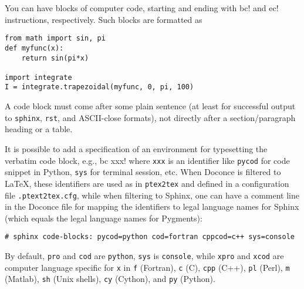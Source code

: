 \documentclass[%
oneside,                 %
final,                   %
10pt]{article}
\begin{document}
You can have blocks of computer code, starting and ending with
{\fontsize{10pt}{10pt}\Verb!!bc!} and {\fontsize{10pt}{10pt}\Verb!!ec!} instructions, respectively. Such blocks are formatted as

\providecommand{\shadedskip}{}
\renewenvironment{shadedskip}{
\def\FrameCommand{\colorbox{shadecolor}}\FrameRule0.6pt
\MakeFramed {\FrameRestore}\vskip3mm}{\vskip0mm\endMakeFramed}
\providecommand{\shadedquoteBlue}{}
\renewenvironment{shadedquoteBlue}[1][]{
\bgroup\rmfamily
\fboxsep=0mm\relax
\begin{shadedskip}
\list{}{\parsep=-2mm\parskip=0mm\topsep=0pt\leftmargin=2mm
\rightmargin=2\leftmargin\leftmargin=4pt\relax}
\item\relax}
{\endlist\end{shadedskip}\egroup}\begin{shadedquoteBlue}
\fontsize{9pt}{9pt}
\begin{Verbatim}
from math import sin, pi
def myfunc(x):
    return sin(pi*x)

import integrate
I = integrate.trapezoidal(myfunc, 0, pi, 100)
\end{Verbatim}
\end{shadedquoteBlue}
\noindent
A code block must come after some plain sentence (at least for successful
output to {\fontsize{10pt}{10pt}\Verb!sphinx!}, {\fontsize{10pt}{10pt}\Verb!rst!}, and ASCII-close formats),
not directly after a section/paragraph heading or a table.

It is possible to add a specification of an
environment for typesetting the verbatim code block, e.g., {\fontsize{10pt}{10pt}\Verb!!bc xxx!}
where {\fontsize{10pt}{10pt}\Verb!xxx!} is an identifier like {\fontsize{10pt}{10pt}\Verb!pycod!} for code snippet in Python,
{\fontsize{10pt}{10pt}\Verb!sys!} for terminal session, etc. When Doconce is filtered to {\LaTeX},
these identifiers are used as in {\fontsize{10pt}{10pt}\Verb!ptex2tex!} and defined in a
configuration file {\fontsize{10pt}{10pt}\Verb!.ptext2tex.cfg!}, while when filtering
to Sphinx, one can have a comment line in the Doconce file for
mapping the identifiers to legal language names for Sphinx (which equals
the legal language names for Pygments):
\begin{Verbatim}[fontsize=\fontsize{9pt}{9pt},tabsize=8,baselinestretch=0.85,
fontfamily=tt,xleftmargin=7mm]
# sphinx code-blocks: pycod=python cod=fortran cppcod=c++ sys=console
\end{Verbatim}
\noindent
By default, {\fontsize{10pt}{10pt}\Verb!pro!} and {\fontsize{10pt}{10pt}\Verb!cod!} are {\fontsize{10pt}{10pt}\Verb!python!}, {\fontsize{10pt}{10pt}\Verb!sys!} is {\fontsize{10pt}{10pt}\Verb!console!},
while {\fontsize{10pt}{10pt}\Verb!xpro!} and {\fontsize{10pt}{10pt}\Verb!xcod!} are computer language specific for {\fontsize{10pt}{10pt}\Verb!x!}
in {\fontsize{10pt}{10pt}\Verb!f!} (Fortran), {\fontsize{10pt}{10pt}\Verb!c!} (C), {\fontsize{10pt}{10pt}\Verb!cpp!} (C++), {\fontsize{10pt}{10pt}\Verb!pl!} (Perl), {\fontsize{10pt}{10pt}\Verb!m!} (Matlab),
{\fontsize{10pt}{10pt}\Verb!sh!} (Unix shells), {\fontsize{10pt}{10pt}\Verb!cy!} (Cython), and {\fontsize{10pt}{10pt}\Verb!py!} (Python).
\end{document}
